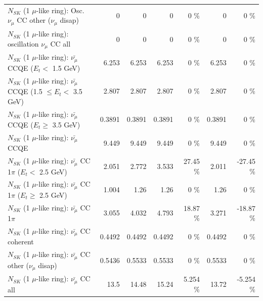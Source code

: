 \begin{table}
\begin{tabular}{| l | r | r | r  r | r  r |}
         $N_{SK}$ (1 $\mu$-like ring): Osc. $\nu_\mu$ CC other ($\nu_\mu$ disap) &               0 &               0 &               0 &        0 \%  &               0 &        0 \%  \\ 
                      $N_{SK}$ (1 $\mu$-like ring): oscillation $\nu_\mu$ CC all &               0 &               0 &               0 &        0 \%  &               0 &        0 \%  \\ 
\hline
\hline
          $N_{SK}$ (1 $\mu$-like ring): $\bar{\nu_\mu}$ CCQE ($E_{t} <$ 1.5 GeV) &           6.253 &           6.253 &           6.253 &        0 \%  &           6.253 &        0 \%  \\ 
 $N_{SK}$ (1 $\mu$-like ring): $\bar{\nu_\mu}$ CCQE (1.5 $\leq E_{t} <$ 3.5 GeV) &           2.807 &           2.807 &           2.807 &        0 \%  &           2.807 &        0 \%  \\ 
       $N_{SK}$ (1 $\mu$-like ring): $\bar{\nu_\mu}$ CCQE ($E_{t} \geq$ 3.5 GeV) &          0.3891 &          0.3891 &          0.3891 &        0 \%  &          0.3891 &        0 \%  \\ 
\hline
                              $N_{SK}$ (1 $\mu$-like ring): $\bar{\nu_\mu}$ CCQE &           9.449 &           9.449 &           9.449 &        0 \%  &           9.449 &        0 \%  \\ 
\hline
     $N_{SK}$ (1 $\mu$-like ring): $\bar{\nu_\mu}$ CC 1$\pi$ ($E_{t} <$ 2.5 GeV) &           2.051 &           2.772 &           3.533 &    27.45 \%  &           2.011 &   -27.45 \%  \\ 
  $N_{SK}$ (1 $\mu$-like ring): $\bar{\nu_\mu}$ CC 1$\pi$ ($E_{t} \geq$ 2.5 GeV) &           1.004 &            1.26 &            1.26 &        0 \%  &            1.26 &        0 \%  \\ 
\hline
                         $N_{SK}$ (1 $\mu$-like ring): $\bar{\nu_\mu}$ CC 1$\pi$ &           3.055 &           4.032 &           4.793 &    18.87 \%  &           3.271 &   -18.87 \%  \\ 
                       $N_{SK}$ (1 $\mu$-like ring): $\bar{\nu_\mu}$ CC coherent &          0.4492 &          0.4492 &          0.4492 &        0 \%  &          0.4492 &        0 \%  \\ 
        $N_{SK}$ (1 $\mu$-like ring): $\bar{\nu_\mu}$ CC other ($\nu_\mu$ disap) &          0.5436 &          0.5533 &          0.5533 &        0 \%  &          0.5533 &        0 \%  \\ 
                          $N_{SK}$ (1 $\mu$-like ring): $\bar{\nu_{\mu}}$ CC all &            13.5 &           14.48 &           15.24 &    5.254 \%  &           13.72 &   -5.254 \%  \\ 

\end{tabular}
\end{table}

